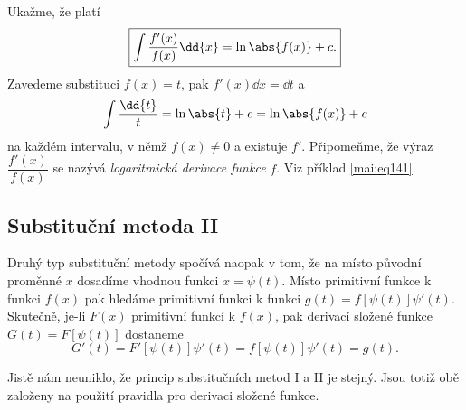      

      

      

      

      Ukažme, že platí 
      \begin{equation}\label{mai:eq139}
        \boxed{\int{\dfrac{f'(x)}{f(x)}}\dd{x} = \ln\abs{f(x)} + c.}
      \end{equation}
      Zavedeme substituci \(f(x) =t\), pak \(f'(x)\dd{x} = \dd{t}\) a 
      \begin{equation*}
        \int{\dfrac{\dd{t}}{t}} = \ln\abs{t} + c = \ln\abs{f(x)} + c
      \end{equation*}
      na každém intervalu, v němž \(f(x)\neq 0\) a existuje \(f'\). Připomeňme, že výraz
      \(\dfrac{f'(x)}{f(x)}\) se nazývá \emph{logaritmická derivace funkce} \(f\). Viz příklad
      \ref{mai:eq141}.
   

    \newpage
    \subsection{Substituční metoda II}
      Druhý typ substituční metody spočívá naopak v tom, že na místo původní proměnné \(x\) 
      dosadíme vhodnou funkci \(x = \psi(t)\). Místo primitivní funkce k funkci \(f(x)\) pak 
      hledáme primitivní funkci k funkci \(g(t) = f[\psi(t)]\psi'(t)\). Skutečně, je-li \(F(x)\) 
      primitivní funkcí k \(f(x)\), pak derivací složené funkce \(G(t) = F[\psi(t)]\) dostaneme
      \begin{equation*}
       G'(t) = F'[\psi(t)]\psi'(t) = f[\psi(t)]\psi'(t) = g(t).
      \end{equation*}

      

      Jistě nám neuniklo, že princip substitučních metod I a II je stejný. Jsou totiž obě založeny 
      na použití pravidla pro derivaci složené funkce.
       

